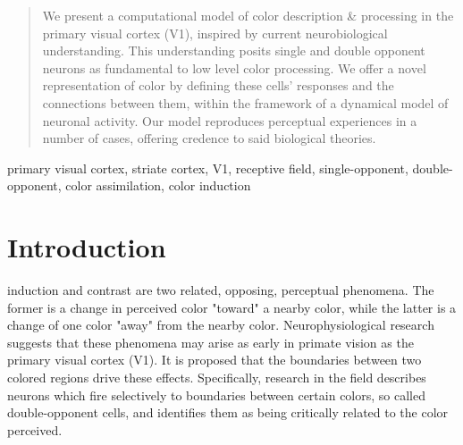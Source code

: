 \documentclass[journal,onecolumn]{IEEEtran}
\begin{document}
\begin{abstract}
We present a computational model of color description \& processing in the primary visual cortex (V1), inspired by current neurobiological understanding. This understanding posits single and double opponent neurons as fundamental to low level color processing. We offer a novel representation of color by defining these cells' responses and the connections between them, within the framework of a dynamical model of neuronal activity. Our model reproduces perceptual experiences in a number of cases, offering credence to said biological theories.
\end{abstract}

\begin{IEEEkeywords}
primary visual cortex, striate cortex, V1, receptive field, single-opponent, double-opponent, color assimilation, color induction
\end{IEEEkeywords}


%
\IEEEpeerreviewmaketitle



\section{Introduction}


 induction and contrast are two related, opposing, perceptual phenomena. The former is a change in perceived color "toward" a nearby color, while the latter is a change of one color "away" from the nearby color. Neurophysiological research suggests that these phenomena may arise as early in primate vision as the primary visual cortex (V1). It is proposed that the boundaries between two colored regions drive these effects. Specifically, research in the field describes neurons which fire selectively to boundaries between certain colors, so called double-opponent cells, and identifies them as being critically related to the color perceived.
\end{document}

